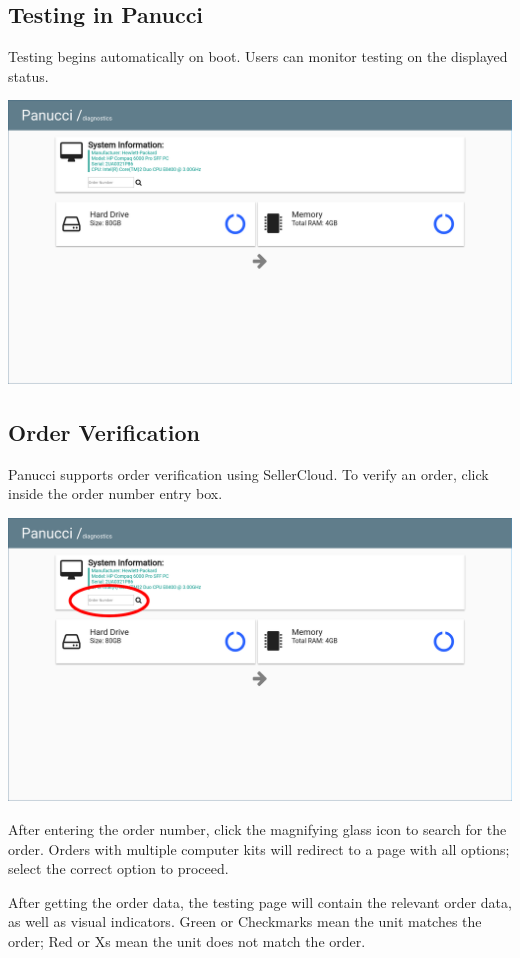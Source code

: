\documentclass{article}
\begin{document}
\begin{flushleft}
\subsection{Testing in Panucci}
Testing begins automatically on boot.  Users can monitor testing on the displayed status.

\includegraphics[width=\textwidth]{testing_view}

\subsection{Order Verification}
Panucci supports order verification using SellerCloud.  To verify an order, click inside the order number entry box.

\includegraphics[width=\textwidth]{order_box}

After entering the order number, click the magnifying glass icon to search for the order.  Orders with multiple computer kits will redirect to a page with all options; select the correct option to proceed.

After getting the order data, the testing page will contain the relevant order data, as well as visual indicators.  \textcolor{successgreen}{Green or Checkmarks} mean the unit matches the order; \textcolor{failurered}{Red or Xs} mean the unit does not match the order.


\end{flushleft}
\end{document}
